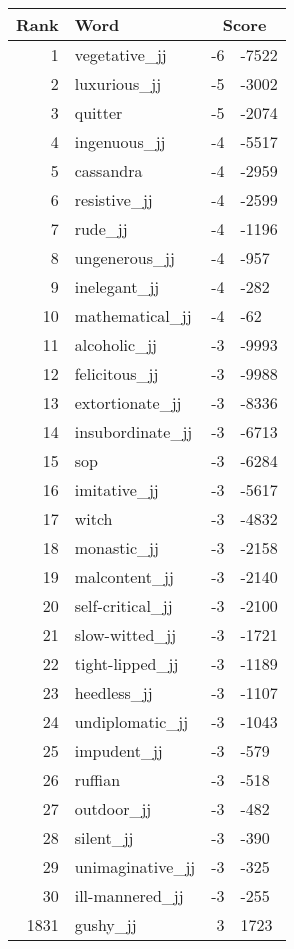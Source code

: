 \begin{longtable}[!htbp]{| rlr@{.}l |}
    \hline
    \textbf{Rank} & \textbf{Word} & \multicolumn{2}{c|}{\textbf{Score}} \\
    \hline
    \endhead
    1 & vegetative\_jj & -6 & -7522 \\
    2 & luxurious\_jj & -5 & -3002 \\
    3 & quitter & -5 & -2074 \\
    4 & ingenuous\_jj & -4 & -5517 \\
    5 & cassandra & -4 & -2959 \\
    6 & resistive\_jj & -4 & -2599 \\
    7 & rude\_jj & -4 & -1196 \\
    8 & ungenerous\_jj & -4 & -957 \\
    9 & inelegant\_jj & -4 & -282 \\
    10 & mathematical\_jj & -4 & -62 \\
    11 & alcoholic\_jj & -3 & -9993 \\
    12 & felicitous\_jj & -3 & -9988 \\
    13 & extortionate\_jj & -3 & -8336 \\
    14 & insubordinate\_jj & -3 & -6713 \\
    15 & sop & -3 & -6284 \\
    16 & imitative\_jj & -3 & -5617 \\
    17 & witch & -3 & -4832 \\
    18 & monastic\_jj & -3 & -2158 \\
    19 & malcontent\_jj & -3 & -2140 \\
    20 & self-critical\_jj & -3 & -2100 \\
    21 & slow-witted\_jj & -3 & -1721 \\
    22 & tight-lipped\_jj & -3 & -1189 \\
    23 & heedless\_jj & -3 & -1107 \\
    24 & undiplomatic\_jj & -3 & -1043 \\
    25 & impudent\_jj & -3 & -579 \\
    26 & ruffian & -3 & -518 \\
    27 & outdoor\_jj & -3 & -482 \\
    28 & silent\_jj & -3 & -390 \\
    29 & unimaginative\_jj & -3 & -325 \\
    30 & ill-mannered\_jj & -3 & -255 \\
    1831 & gushy\_jj & 3 & 1723 \\

\end{longtable}
